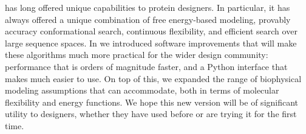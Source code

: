\osprey has long offered unique capabilities to protein designers.  In particular, it has always offered a unique combination of free energy-based modeling, provably accuracy conformational search, continuous flexibility, and efficient search over large sequence spaces.  In  we introduced software improvements that will make these algorithms much more practical for the wider design community: performance that is orders of magnitude faster, and a Python interface that makes \osprey much easier to use.  On top of this, we expanded the range of biophysical modeling assumptions that \osprey can accommodate, both in terms of molecular flexibility and energy functions.  We hope this new version will be of significant utility to designers, whether they have used \osprey before or are trying it for the first time.  

